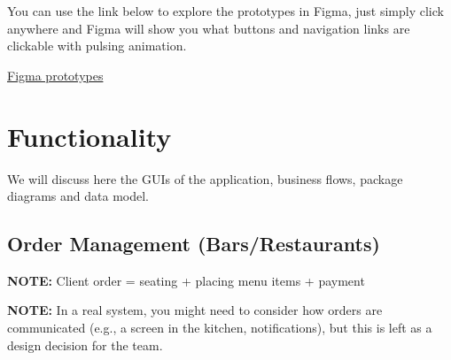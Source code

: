 \documentclass[]{VUMIFTemplateClass}
\newcommand{\noticecomment}[1]{%
    \begin{tcolorbox}[colback=blue!20, colframe=blue!60, arc=0pt, outer arc=0pt, boxrule=1pt, left=3pt, right=3pt, top=3pt, bottom=3pt]
        \textbf{\textcolor{blue!70!black}{NOTE:}} #1
    \end{tcolorbox}
}
\begin{document}
You can use the link below to explore the prototypes in Figma, just simply click anywhere and Figma will show you what buttons and navigation links are clickable with pulsing animation.

\href{https://www.figma.com/design/IpiyOU6rDdMWJAuKfbXnuQ/HCI-2025-mockups?node-id=0-1&t=qFGqf8yRbP1gP6IJ-1}{Figma prototypes}




\section{Functionality}
We will discuss here the GUIs of the application, business flows, package diagrams and data model.

\subsection{Order Management (Bars/Restaurants)}


\noticecomment{Client order = seating + placing menu items + payment}

\noticecomment{In a real system, you might need to consider how orders are communicated (e.g., a screen in the kitchen, notifications), but this is left as a design decision for the team.}
\end{document}
